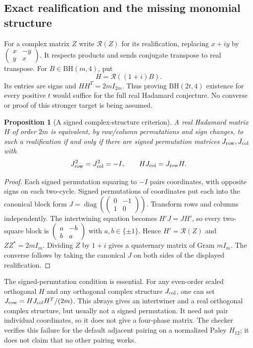 \documentclass[11pt]{article}
\newtheorem{proposition}[theorem]{Proposition}
\begin{document}
\subsection{Exact realification and the missing monomial structure}
For a complex matrix $Z$ write $\mathcal R(Z)$ for its realification,
replacing $x+iy$ by $\left(\begin{smallmatrix}x&-y\\y&x\end{smallmatrix}\right)$.
It respects products and sends conjugate transpose to real transpose.
For $B\in\mathrm{BH}(m,4)$, put
\[
                   H=\mathcal R((1+i)B).
\]
Its entries are signs and $HH^T=2mI_{2m}$. Thus proving
$\mathrm{BH}(2t,4)$ existence for every positive $t$ would suffice
for the full real Hadamard conjecture. No converse or proof of this
stronger target is being assumed.

\begin{proposition}[A signed complex-structure criterion]
\label{quat:structure}
A real Hadamard matrix $H$ of order $2m$ is equivalent, by row/column
permutations and sign changes, to such a realification if and only if there are signed
permutation matrices $J_{\rm row},J_{\rm col}$ with
\[
 J_{\rm row}^2=J_{\rm col}^2=-I,\qquad
                         HJ_{\rm col}=J_{\rm row}H.
\]
\end{proposition}
\begin{proof}
Each signed permutation squaring to $-I$ pairs coordinates, with
opposite signs on each two-cycle. Signed permutations of coordinates
put each into the canonical block form
$J=\operatorname{diag}(\left(\begin{smallmatrix}0&-1\\1&0\end{smallmatrix}\right))$.
Transform rows and columns independently. The intertwining equation
becomes $H'J=JH'$, so every two-square block is
$\left(\begin{smallmatrix}a&-b\\b&a\end{smallmatrix}\right)$ with
$a,b\in\{\pm1\}$. Hence $H'=\mathcal R(Z)$ and
$ZZ^*=2mI_m$. Dividing $Z$ by $1+i$ gives a quaternary matrix
of Gram $mI_m$. The converse follows by taking the canonical $J$
on both sides of the displayed realification.
\end{proof}

The signed-permutation condition is essential. For any even-order
scaled orthogonal $H$ and any orthogonal complex structure $J_{\rm col}$,
one can set $J_{\rm row}=HJ_{\rm col}H^T/(2m)$. This always gives
an intertwiner and a real orthogonal complex structure, but usually
not a signed permutation. It need not pair individual coordinates,
so it does not give a four-phase matrix. The checker verifies this
failure for the default adjacent pairing on a normalized Paley $H_{12}$;
it does not claim that no other pairing works.
\end{document}
